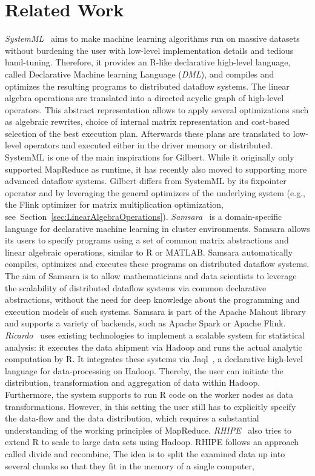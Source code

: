 \section{Related Work}
\label{sec:relatedWork}

{\em SystemML}~\cite{ghoting:2011a,Boehm2014,Boehm2014Hybrid,Schelter2015,Elgohary2016} aims to make machine learning algorithms run on massive datasets without burdening the user with low-level implementation details and tedious hand-tuning. Therefore, it provides an R-like declarative high-level language, called Declarative Machine learning Language (\emph{DML}), and compiles and optimizes the resulting programs to distributed dataflow systems.  The linear algebra operations are translated into a directed acyclic graph of high-level operators. This abstract representation allows to apply several optimizations such as algebraic rewrites, choice of internal matrix representation and cost-based selection of the best execution plan. Afterwards these plans are translated to low-level operators and executed either in the driver memory or distributed. SystemML is one of the main inspirations for Gilbert. While it originally only supported MapReduce as runtime, it has recently also moved to supporting more advanced dataflow systems. Gilbert differs from SystemML by its fixpointer operator and by leveraging the general optimizers of the underlying system (e.g., the Flink optimizer for matrix multiplication optimization, see~Section~\ref{sec:LinearAlgebraOperations}). {\em Samsara}~\cite{Lyubimov2016, Schelter2016} is a domain-specific language for declarative machine learning in cluster environments. Samsara allows its users to specify programs using a set of common matrix abstractions and linear algebraic operations, similar to R or MATLAB. Samsara automatically compiles, optimizes and executes these programs on distributed dataflow systems. The aim of Samsara is to allow mathematicians and data scientists to leverage the scalability of distributed dataflow systems via common declarative abstractions, without the need for deep knowledge about the programming and execution models of such systems. Samsara is part of the Apache Mahout library~\cite{mahout:2011a} and supports a variety of backends, such as Apache Spark or Apache Flink. {\em Ricardo}~\cite{das:2010a} uses existing technologies to implement a scalable system for statistical analysis: it executes the data shipment via Hadoop and runs the actual analytic computation by R. It integrates these systems via Jaql~\cite{beyer:2011a}, a declarative high-level language for data-processing on Hadoop. Thereby, the user can initiate the distribution, transformation and aggregation of data within Hadoop. Furthermore, the system supports to run R code on the worker nodes as data transformations. However, in this setting the user still has to explicitly specify the data-flow and the data distribution, which requires a substantial understanding of the working principles of MapReduce. {\em RHIPE}~\cite{guha:s2012a} also tries to extend R to scale to large data sets using Hadoop. RHIPE follows an approach called divide and recombine, The idea is to split the examined data up into several chunks so that they fit in the memory of a single computer, 
